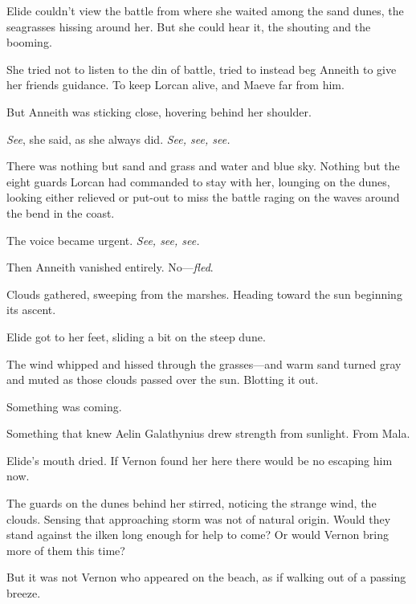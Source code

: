 Elide couldn't view the battle from where she waited among the sand dunes, the seagrasses hissing around her. But she could hear it, the shouting and the booming.

She tried not to listen to the din of battle, tried to instead beg Anneith to give her friends guidance. To keep Lorcan alive, and Maeve far from him.

But Anneith was sticking close, hovering behind her shoulder.

\emph{See}, she said, as she always did. \emph{See, see, see.}

There was nothing but sand and grass and water and blue sky. Nothing but the eight guards Lorcan had commanded to stay with her, lounging on the dunes, looking either relieved or put-out to miss the battle raging on the waves around the bend in the coast.

The voice became urgent. \emph{See, see, see.}

Then Anneith vanished entirely. No---\emph{fled}.

Clouds gathered, sweeping from the marshes. Heading toward the sun beginning its ascent.

Elide got to her feet, sliding a bit on the steep dune.

The wind whipped and hissed through the grasses---and warm sand turned gray and muted as those clouds passed over the sun. Blotting it out.

Something was coming.

Something that knew Aelin Galathynius drew strength from sunlight. From Mala.

Elide's mouth dried. If Vernon found her here  there would be no escaping him now.

The guards on the dunes behind her stirred, noticing the strange wind, the clouds. Sensing that approaching storm was not of natural origin. Would they stand against the ilken long enough for help to come? Or would Vernon bring more of them this time?

But it was not Vernon who appeared on the beach, as if walking out of a passing breeze.

